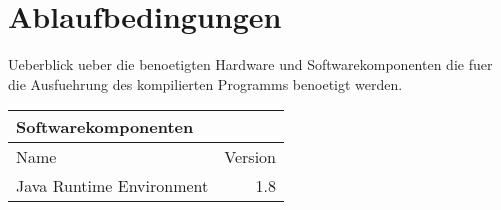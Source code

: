 \section{Ablaufbedingungen}
Ueberblick ueber die benoetigten Hardware und Softwarekomponenten die fuer die Ausfuehrung des kompilierten Programms benoetigt werden. 

\begin{table}[h!]
	\begin{tabular}{lr} 
	\toprule
	Softwarekomponenten\\  
	\midrule 
	Name & Version\\ 
	\midrule 
	Java Runtime Environment & 1.8\\ 
	\bottomrule
	\end{tabular}
	\label{tab:ablaufbedingungen}
\end{table}


